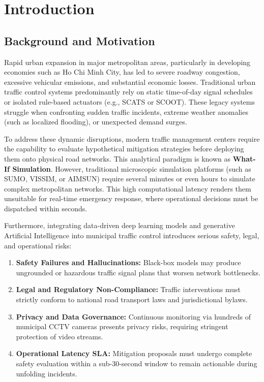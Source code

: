 \chapter{Introduction}
\label{chapter:introduction}

\section{Background and Motivation}
Rapid urban expansion in major metropolitan areas, particularly in developing economies such as Ho Chi Minh City, has led to severe roadway congestion, excessive vehicular emissions, and substantial economic losses. Traditional urban traffic control systems predominantly rely on static time-of-day signal schedules or isolated rule-based actuators (e.g., SCATS or SCOOT). These legacy systems struggle when confronting sudden traffic incidents, extreme weather anomalies (such as localized flooding), or unexpected demand surges.

To address these dynamic disruptions, modern traffic management centers require the capability to evaluate hypothetical mitigation strategies before deploying them onto physical road networks. This analytical paradigm is known as \textbf{What-If Simulation}. However, traditional microscopic simulation platforms (such as SUMO, VISSIM, or AIMSUN) require several minutes or even hours to simulate complex metropolitan networks. This high computational latency renders them unsuitable for real-time emergency response, where operational decisions must be dispatched within seconds.

Furthermore, integrating data-driven deep learning models and generative Artificial Intelligence into municipal traffic control introduces serious safety, legal, and operational risks:
\begin{enumerate}[leftmargin=1.5cm, label=(\roman*)]
  \item \textbf{Safety Failures and Hallucinations:} Black-box models may produce ungrounded or hazardous traffic signal plans that worsen network bottlenecks.
  \item \textbf{Legal and Regulatory Non-Compliance:} Traffic interventions must strictly conform to national road transport laws and jurisdictional bylaws.
  \item \textbf{Privacy and Data Governance:} Continuous monitoring via hundreds of municipal CCTV cameras presents privacy risks, requiring stringent protection of video streams.
  \item \textbf{Operational Latency SLA:} Mitigation proposals must undergo complete safety evaluation within a sub-30-second window to remain actionable during unfolding incidents.
\end{enumerate}

